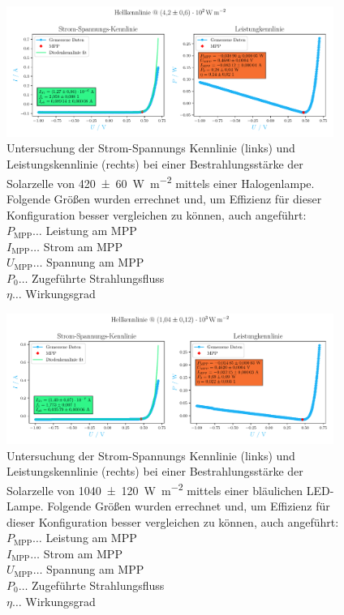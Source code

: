 \documentclass[12pt,english,ngerman]{scrartcl}
\begin{document}
\begin{figure}[H]
	\centering
	\includegraphics[width=0.95\textwidth]{figures/helllampe2.pdf}
	\caption[Kennlinie durch Halogen-Lampen 2.te Belichtung]{Untersuchung der
		Strom-Spannungs Kennlinie (links) und Leistungskennlinie (rechts) bei einer
		Bestrahlungsstärke der Solarzelle von \SI{420(60)}{\watt\per\meter\squared}
		mittels einer Halogenlampe. Folgende Größen wurden errechnet und, um Effizienz
		für dieser Konfiguration besser vergleichen zu können, auch angeführt: \\
		$P_\text{MPP} \dots$ Leistung am MPP                                   \\
		$I_\text{MPP} \dots$ Strom am MPP                                      \\
		$U_\text{MPP} \dots$ Spannung am MPP                                   \\
		$P_0 \dots$ Zugeführte Strahlungsfluss                                 \\
		$\eta \dots$ Wirkungsgrad
	}\label{fig:ausw_kennlinie_hell_lampe2}
\end{figure}

\begin{figure}[H]
	\centering
	\includegraphics[width=0.95\textwidth]{figures/hellled.pdf}
	\caption[Kennlinie durch LED-Lampen Belichtung]{Untersuchung der Strom-Spannungs
		Kennlinie (links) und Leistungskennlinie (rechts) bei einer Bestrahlungsstärke
		der Solarzelle von \SI{1040(120)}{\watt\per\meter\squared} mittels einer
		bläulichen LED-Lampe. Folgende Größen wurden errechnet und, um Effizienz für
		dieser Konfiguration besser vergleichen zu können, auch angeführt: \\
		$P_\text{MPP} \dots$ Leistung am MPP                               \\
		$I_\text{MPP} \dots$ Strom am MPP                                  \\
		$U_\text{MPP} \dots$ Spannung am MPP                               \\
		$P_0 \dots$ Zugeführte Strahlungsfluss                             \\
		$\eta \dots$ Wirkungsgrad
	}\label{fig:ausw_kennlinie_hell_led}
\end{figure}
\end{document}
